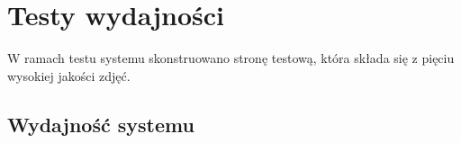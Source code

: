 \chapter{Testy wydajności}
\label{cha:testyIOptymalizacje}

W ramach testu systemu skonstruowano stronę testową, która składa się z pięciu wysokiej jakości zdjęć.



\section{Wydajność systemu}
\label{sec:wydajnosc}



